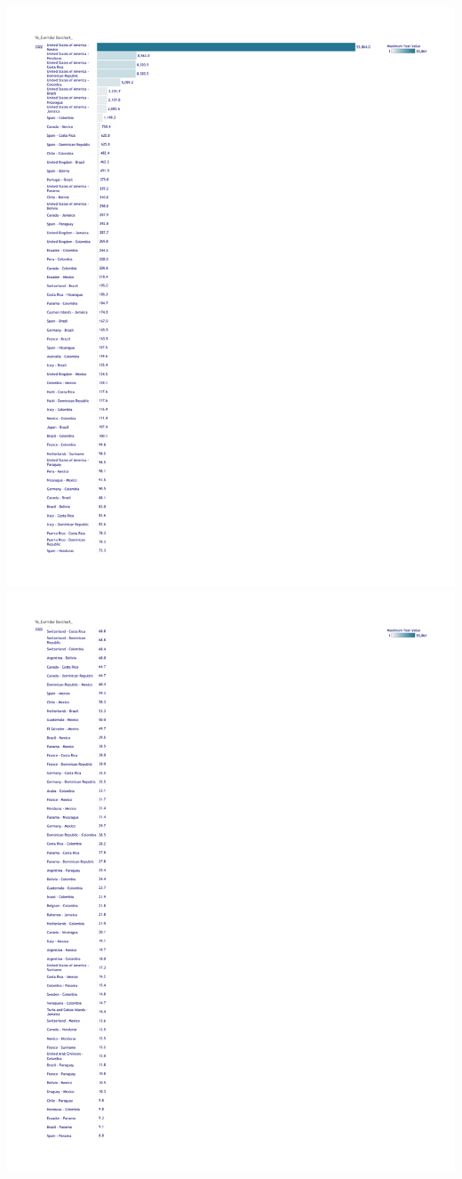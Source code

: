 \documentclass[
  11pt,
]{article}
\begin{document}
\includegraphics{data/Remittance_3/remitscope_page_36.png}
\includegraphics{data/Remittance_3/remitscope_page_37.png}
\end{document}
